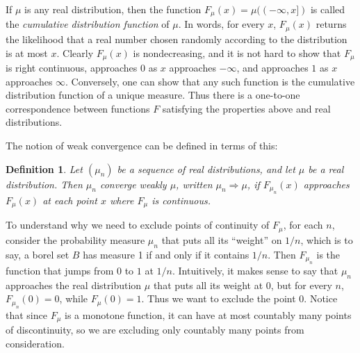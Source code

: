 \documentclass{article}
\newtheorem{definition}[theorem]{Definition}
\begin{document}
If $\mu$ is any real distribution, then the function $F_\mu(x) = \mu((-\infty, x])$ is called the \emph{cumulative distribution function} of $\mu$. In words, for every $x$, $F_\mu(x)$ returns the likelihood that a real number chosen randomly according to the distribution is at most $x$. Clearly $F_\mu(x)$ is nondecreasing,
and it is not hard to show that $F_\mu$ is right continuous, approaches $0$ as $x$ approaches $-\infty$, and approaches $1$ as $x$ approaches $\infty$. Conversely, one can show that any such function is the cumulative distribution function of a unique measure. Thus there is a one-to-one correspondence between functions $F$ satisfying the properties above and real distributions.

The notion of weak convergence can be defined in terms of this:
\begin{definition}
 Let $(\mu_n)$ be a sequence of real distributions, and let $\mu$ be a real distribution. Then \emph{$\mu_n$ converge weakly $\mu$}, written $\mu_n \Rightarrow \mu$, if $F_{\mu_n}(x)$ approaches $F_\mu(x)$ at each point $x$ where $F_\mu$ is continuous.
\end{definition}

To understand why we need to exclude points of continuity of $F_\mu$, for each $n$, consider the probability measure $\mu_n$ that puts all its ``weight'' on $1 / n$, which is to say, a borel set $B$ has measure 1 if and only if it contains $1 / n$. Then $F_{\mu_n}$ is the function that jumps from $0$ to $1$ at $1 / n$. Intuitively, it makes sense to say that $\mu_n$ approaches the real distribution $\mu$ that puts all its weight at $0$, but for every $n$, $F_{\mu_n}(0) = 0$, while $F_\mu(0) = 1$. Thus we want to exclude the point $0$. Notice that since $F_\mu$ is a monotone function, it can have at most countably many points of discontinuity, so we are excluding only countably many points from consideration.
\end{document}
